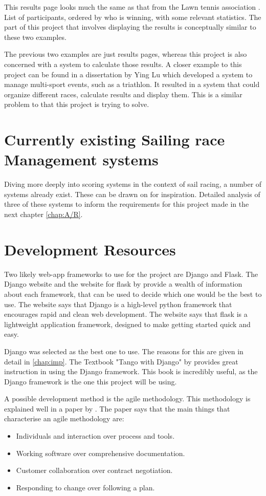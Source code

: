 \documentclass{l4proj}
\begin{document}
This results page looks much the same as that from the Lawn tennis association \citet{Tennis}. List of participants, ordered by who is winning, with some relevant statistics. The part of this project that involves displaying the results is conceptually similar to these two examples.

The previous two examples are just results pages, whereas this project is also concerned with a system to calculate those results. A closer example to this project can be found in a dissertation by Ying Lu \citet{Multi-sport} which developed a system to manage multi-sport events, such as a triathlon. It resulted in a system that could organize different races, calculate results and display them. This is a similar problem to that this project is trying to solve.

\section{Currently existing Sailing race Management systems}
Diving more deeply into scoring systems in the context of sail racing, a number of systems already exist. These can be drawn on for inspiration. Detailed analysis of three of these systems to inform the requirements for this project made in the next chapter \autoref{chap:A/R}.

\section{Development Resources}

Two likely web-app frameworks to use for the project are Django and Flask. The Django website \citep{django} and the website for flask by \citet{flask} provide a wealth of information about each framework, that can be used to decide which one would be the best to use. The \citet{django} website says that Django is a high-level python framework that encourages rapid and clean web development. The \citet{flask} website says that flask is a lightweight application framework, designed to make getting started quick and easy.

Django was selected as the best one to use. The reasons for this are given in detail in \ref{chap:imp}. The Textbook "Tango with Django" by \citet{tango} provides great instruction in using the Django framework. This book is incredibly useful, as the Django framework is the one this project will be using.

A possible development method is the agile methodology. This methodology is explained well in a paper by \citet{agile}. The paper says that the main things that characterise an agile methodology are:
\begin{itemize}
    \item 
    Individuals and interaction over process and tools.
    \item 
    Working software over comprehensive documentation.
    \item 
    Customer collaboration over contract negotiation.
    \item 
    Responding to change over following a plan.
\end{itemize}
\end{document}
